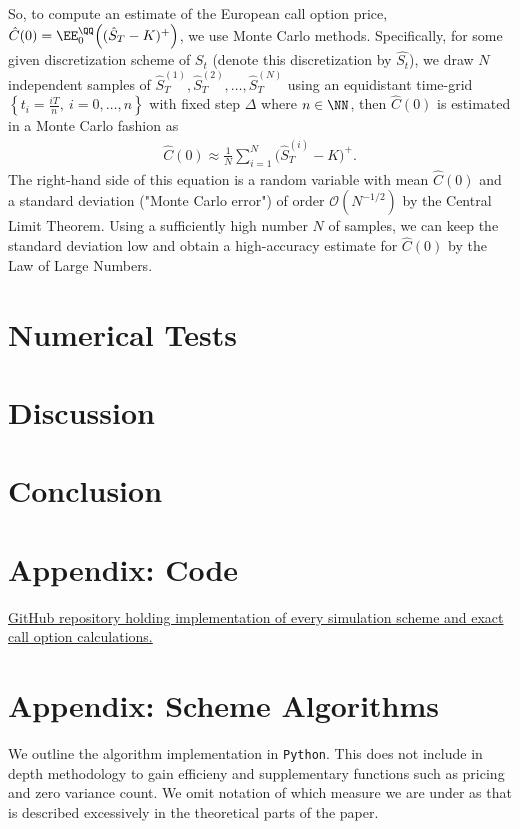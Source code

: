 \documentclass[11pt]{article}
\numberwithin{equation}{section}
\begin{document}
So, to compute an estimate of the European call option price, $\hat{C}(0)=\EE_0^\QQ
\Big( (\hat{S}_T-K)^+ \Big)$, we use Monte Carlo methods.
Specifically, for some given discretization scheme of $S_t$ (denote this discretization by $\hat{S_t}$), we draw $N$ independent
samples of $\hat{S}_T^{(1)},\hat{S}_T^{(2)}, \ldots, \hat{S}_T^{(N)}$
using an equidistant time-grid $\left \{ t_i = \frac{iT}{n}, \: i=0,\ldots,n
\right \}$ with fixed step $\Delta$ where $n\in \NN$, then $\hat{C}(0)$ is estimated
in a Monte Carlo fashion as
\begin{align*}
    \hat{C}(0)\approx \frac{1}{N}\sum_{i=1}^{N} \Big(\hat{S}_T^{(i)}-K \Big)^+.
\end{align*}
The right-hand side of this equation is a random variable with mean $\hat{C}(0)$
and a standard deviation ("Monte Carlo error") of order $\mathcal{O}(N^{-1/2})$
by the Central Limit Theorem.
Using a sufficiently high number $ N $ of samples, we can keep the standard
deviation low and obtain a high-accuracy estimate for $\hat{C}(0)$ by the Law of
Large Numbers.

\section{Numerical Tests}
\section{Discussion}
\section{Conclusion}
\appendix
\section{Appendix: Code}\label{chap:code}
\href{https://github.com/YoussefRaad-mathecon/Handin-3}{GitHub repository holding implementation of every simulation scheme and exact call option calculations.}

\newpage
\section{Appendix: Scheme Algorithms}\label{sec:appendixscheme}
We outline the algorithm implementation in \texttt{Python}. This does not include in depth methodology to gain efficieny and supplementary functions such as pricing and zero variance count. We omit notation of which measure we are under as that is described excessively in the theoretical parts of the paper.
\end{document}
